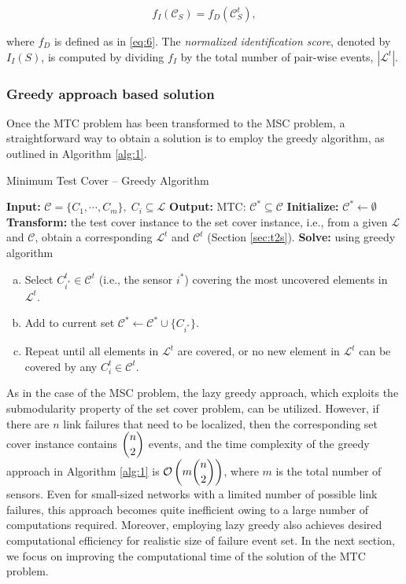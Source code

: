 \documentclass[twocolumn]{autart}
\begin{document}
\begin{equation} \label{eq:objidnt}
f_I(\mathcal{C}_S) =f_D(\mathcal{C}_S^t),
\end{equation}\vspace{-0.35cm}



where $f_D$ is defined as in \eqref{eq:6}.
The \textit{normalized identification score}, denoted by $I_I(S)$, is computed by dividing $f_I$ by the total number of pair-wise events, $|\mathcal{L}^t|$.

\subsubsection{Greedy approach based solution} \vspace{-0.35cm}
Once the MTC problem has been transformed to the MSC problem, a straightforward way to obtain a solution is to employ the greedy algorithm, as outlined in Algorithm \ref{alg:1}.

\begin{algorithm} 
\small
\caption{Minimum Test Cover -- Greedy Algorithm}\label{alg:1}
\begin{algorithmic}[1]
\State \textbf{Input:} $\mathcal{C} = \{C_1,\cdots,C_m\},\;C_i\subseteq\mathcal{L}$
\State \textbf{Output:} MTC: $\mathcal{C}^{{\ast}}\subseteq\mathcal{C}$
\State \textbf{Initialize:} $\mathcal{C}^{{\ast}}\gets \emptyset$
\State \textbf{Transform:} the test cover instance to the set cover instance, i.e., from a given $\mathcal{L}$ and $\mathcal{C}$, obtain a corresponding $\mathcal{L}^t$ and $\mathcal{C}^t$ (Section \ref{sec:t2s}).
\State \textbf{Solve:} using greedy algorithm\label{algo:greedy}
	\begin{enumerate}[(a)]
\item
Select $C_{i^\ast}^t\in\mathcal{C}^t$ (i.e., the sensor $i^\ast$) covering the most uncovered elements in $\mathcal{L}^t$. 
\item Add to current set $\mathcal{C}^{{\ast}}\gets \mathcal{C}^{\ast} \cup \{C_{i^\ast}\}$.
\item Repeat until all elements in $\mathcal{L}^t$ are covered, or no new element in $\mathcal{L}^t$ can be covered by any $C_i^t\in\mathcal{C}^t$.
\end{enumerate}
\end{algorithmic}
\end{algorithm}

As in the case of the MSC problem, the lazy greedy approach, which exploits the submodularity property of the set cover problem, can be utilized. However, if there are $n$ link failures that need to be localized, then the corresponding set cover instance contains $\dbinom{n}{2}$ events, and the time complexity of the greedy approach in Algorithm \ref{alg:1} is $\mathcal{O}\left(m\dbinom{n}{2}\right)$, where $m$ is the total number of sensors. Even for small-sized networks with a limited number of possible link failures, this approach becomes quite inefficient owing to a large number of computations required. Moreover, employing lazy greedy also achieves desired computational efficiency for realistic size of failure event set. In the next section, we focus on improving the computational time of the solution of the MTC problem.
\end{document}
